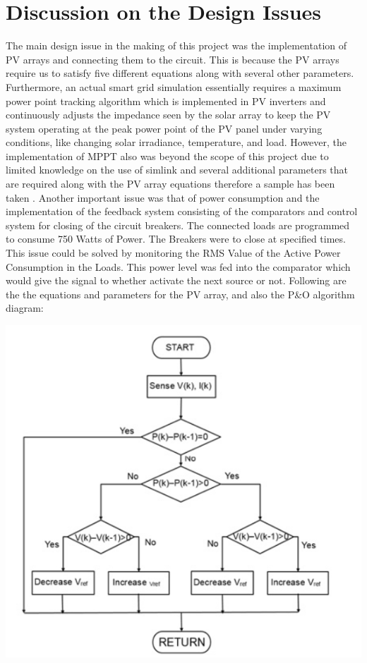 \documentclass[12pt]{report}
\begin{document}
\section*{Discussion on the Design Issues}
The main design issue in the making of this project was the implementation of PV arrays and connecting them to the circuit. This is because the PV arrays require us to satisfy five different equations along with several other parameters. Furthermore, an actual smart grid simulation essentially requires a maximum power point tracking algorithm which is implemented in PV inverters and continuously adjusts the impedance seen by the solar array to keep the PV system operating at the peak power point of the PV panel under varying conditions, like changing solar irradiance, temperature, and load. However, the implementation of MPPT also was beyond the scope of this project due to limited knowledge on the use of simlink and several additional parameters that are required along with the PV array equations therefore a sample has been taken . Another important issue was that of power consumption and the implementation of the feedback system consisting of the comparators and control system for closing of the circuit breakers. The connected loads are programmed to consume 750 Watts of Power. The Breakers were to close at specified times. This issue could be solved by monitoring the RMS Value of the Active Power Consumption in the Loads. This power level was fed into the comparator which would give the signal to whether activate the next source or not. Following are the the equations and parameters for the PV array, and also the P\&O algorithm diagram:
\begin{center}
\includegraphics[scale=0.8]{pics/1.PNG}
\end{center}
\end{document}
